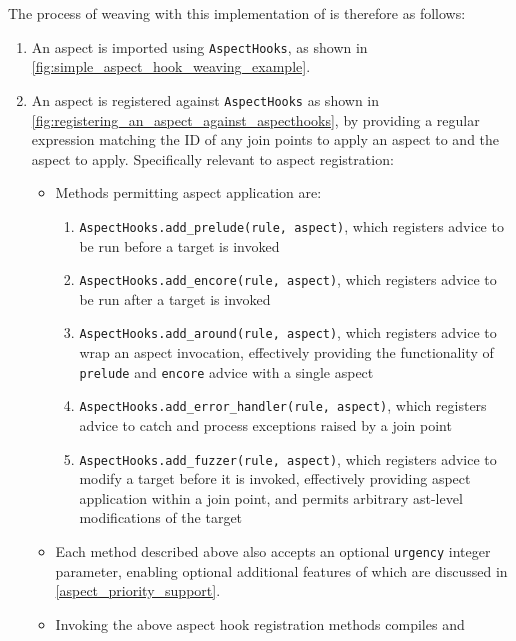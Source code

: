 The process of weaving with this implementation of \pdsf is therefore as
follows:

\begin{enumerate}\label{urgency_mentioned_in_passing}
    \item An aspect is imported using \lstinline{AspectHooks}, as shown in
    \cref{fig:simple_aspect_hook_weaving_example}.
    \item An aspect is registered against \lstinline{AspectHooks} as shown in
    \cref{fig:registering_an_aspect_against_aspecthooks}, by providing a regular
    expression matching the ID of any join points to apply an aspect to and the
    aspect to apply. Specifically relevant to aspect registration:
    \begin{itemize}
        \item Methods permitting aspect application are:
        \begin{enumerate}
            \item \lstinline{AspectHooks.add_prelude(rule, aspect)}, which registers
            advice to be run before a target is invoked
            \item \lstinline{AspectHooks.add_encore(rule, aspect)}, which registers
            advice to be run after a target is invoked
            \item \lstinline{AspectHooks.add_around(rule, aspect)}, which registers
            advice to wrap an aspect invocation, effectively providing the
            functionality of \lstinline{prelude} and \lstinline{encore} advice with
            a single aspect
            \item \lstinline{AspectHooks.add_error_handler(rule, aspect)}, which
            registers advice to catch and process exceptions raised by a join point
            \item \lstinline{AspectHooks.add_fuzzer(rule, aspect)}, which registers
            advice to modify a target before it is invoked, effectively providing
            aspect application within a join point, and permits arbitrary ast-level
            modifications of the target
        \end{enumerate}
        \item Each method described above also accepts an optional
        \lstinline{urgency} integer parameter, enabling optional additional
        features of \pdsf which are discussed in \cref{aspect_priority_support}.
        \item Invoking the above aspect hook registration methods compiles and

\end{itemize}
\end{enumerate}
